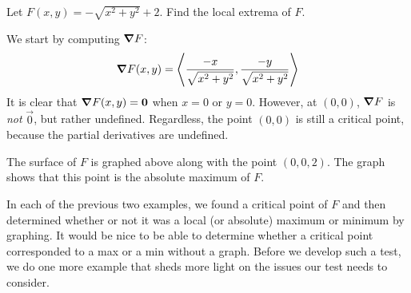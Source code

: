 \documentclass{ximera}
\begin{document}
\begin{example}
  Let $F(x,y) = -\sqrt{x^2+y^2}+2$. Find the local extrema of $F$.
  \begin{explanation}
    We start by computing $\boldsymbol\nabla F$:
    \[
    \boldsymbol\nabla F(x,y) = \left\langle \frac{-x}{\sqrt{x^2+y^2}},\frac{-y}{\sqrt{x^2+y^2}}\right\rangle
    \]
    It is clear that $\boldsymbol\nabla F(x,y) = \mathbf{0}$ when $x=0$ or
    $y=0$. However, at $(0,0)$, $\boldsymbol\nabla F$ is \textit{not} $\vec{0}$,
    but rather undefined. Regardless, the point $(0,0)$ is still a
    critical point, because the partial derivatives are undefined.
    \begin{image}
    \end{image}
    The surface of $F$ is graphed above along with the point
    $(0,0,2)$. The graph shows that this point is the absolute maximum
    of $F$.
  \end{explanation}
\end{example}

In each of the previous two examples, we found a critical point of $F$
and then determined whether or not it was a local (or absolute)
maximum or minimum by graphing. It would be nice to be able to
determine whether a critical point corresponded to a max or a min
without a graph. Before we develop such a test, we do one more example
that sheds more light on the issues our test needs to consider.
\end{document}
